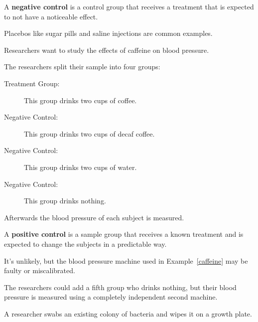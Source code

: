 \documentclass{beamer}
\begin{document}
\begin{frame}
\begin{definition}
A \textbf{negative control} is a control group that receives a treatment that is expected to not have a noticeable effect.
\end{definition}\pause

\begin{note}
Placebos like sugar pills and saline injections are common examples.
\end{note}\pause

\begin{example}\label{caffeine}
Researchers want to study the effects of caffeine on blood pressure.

\vspace{2mm}
The researchers split their sample into four groups:\pause
\begin{description}
\item[Treatment Group:] This group drinks two cups of coffee.\pause
\item[Negative Control:] This group drinks two cups of decaf coffee.\pause
\item[Negative Control:] This group drinks two cups of water.\pause
\item[Negative Control:] This group drinks nothing.\pause
\end{description}

\vspace{1mm}
Afterwards the blood pressure of each subject is measured.
\end{example}
\end{frame}

\begin{frame}
\begin{definition}
A \textbf{positive control} is a sample group that receives a known treatment and is expected to change the subjects in a predictable way.
\end{definition}\pause

\begin{example}
It's unlikely, but the blood pressure machine used in Example~\ref{caffeine} may be faulty or miscalibrated.\pause

\vspace{2mm}
The researchers could add a fifth group who drinks nothing, but their blood pressure is measured using a completely independent second machine.
\end{example}\pause

\begin{example}
A researcher swabs an existing colony of bacteria and wipes it on a growth plate.
\end{example}
\end{frame}
\end{document}
